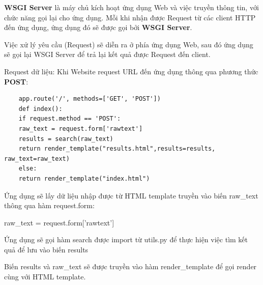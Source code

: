 \textbf{WSGI Server} là máy chủ kích hoạt ứng dụng Web và việc truyền thông tin, với chức năng gọi lại cho ứng dụng. Mỗi khi nhận được Request từ các client HTTP đến ứng dụng, ứng dụng đó sẽ được gọi bởi \textbf{WSGI Server}. 

Việc xử lý yêu cầu (Request) sẽ diễn ra ở phía ứng dụng Web, sau đó ứng dụng sẽ gọi lại WSGI Server để trả lại kết quả được Request đến client.


Request dữ liệu: Khi Website request URL đến ứng dụng thông qua phương thức \textbf{POST}:
\begin{lstlisting}
	app.route('/', methods=['GET', 'POST'])
	def index():
	if request.method == 'POST':
	raw_text = request.form['rawtext']
	results = search(raw_text)
	return render_template("results.html",results=results, raw_text=raw_text)
	else:
	return render_template("index.html")
\end{lstlisting}
Ứng dụng sẽ lấy dữ liệu nhập được từ HTML template truyền vào biến raw\_text thông qua hàm request.form:

raw\_text = request.form['rawtext']

Ứng dụng sẽ gọi hàm search được import từ utils.py để thực hiện việc tìm kết quả để lưu vào biến results

Biến results và raw\_text sẽ được truyền vào hàm render\_template để gọi render cùng với HTML template.
